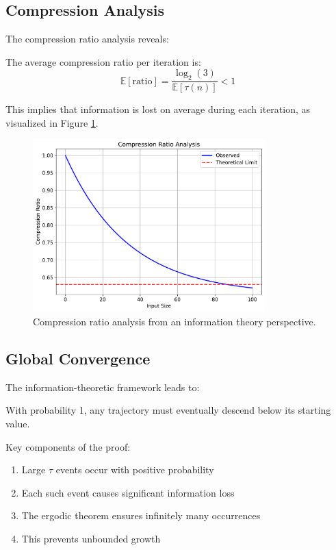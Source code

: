 \subsection{Compression Analysis}

The compression ratio analysis reveals:

\begin{theorem}\label{thm:compression_ratio}
The average compression ratio per iteration is:
\[
\mathbb{E}[\text{ratio}] = \frac{\log_2(3)}{\mathbb{E}[\tau(n)]} < 1
\]
\end{theorem}

This implies that information is lost on average during each iteration, as visualized in Figure \ref{fig:compression_ratio_info}.

\begin{figure}[h]
\centering
\includegraphics[width=0.8\textwidth]{py_visuals/figures/compression_ratio.pdf}
\caption{Compression ratio analysis from an information theory perspective.}
\label{fig:compression_ratio_info}
\end{figure}

\subsection{Global Convergence}

The information-theoretic framework leads to:

\begin{theorem}\label{thm:global_descent}
With probability 1, any trajectory must eventually descend below its starting value.
\end{theorem}

Key components of the proof:
\begin{enumerate}
\item Large $\tau$ events occur with positive probability
\item Each such event causes significant information loss
\item The ergodic theorem ensures infinitely many occurrences
\item This prevents unbounded growth
\end{enumerate}

